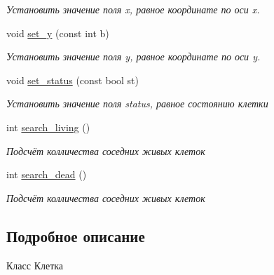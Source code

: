 \begin{DoxyCompactItemize}
\begin{DoxyCompactList}\small\item\em Установить значение поля x, равное координате по оси x. \end{DoxyCompactList}\item 
\hypertarget{classCell_a24fb665d79a98537dbae0764aae6cdc2}{void \hyperlink{classCell_a24fb665d79a98537dbae0764aae6cdc2}{set\+\_\+y} (const int b)}\label{classCell_a24fb665d79a98537dbae0764aae6cdc2}

\begin{DoxyCompactList}\small\item\em Установить значение поля y, равное координате по оси y. \end{DoxyCompactList}\item 
\hypertarget{classCell_aae843541fe3b463ed77d5530e9cab752}{void \hyperlink{classCell_aae843541fe3b463ed77d5530e9cab752}{set\+\_\+status} (const bool st)}\label{classCell_aae843541fe3b463ed77d5530e9cab752}

\begin{DoxyCompactList}\small\item\em Установить значение поля status, равное состоянию клетки \end{DoxyCompactList}\item 
\hypertarget{classCell_ac45949aec18ee3e3a281104e8219242b}{int \hyperlink{classCell_ac45949aec18ee3e3a281104e8219242b}{search\+\_\+living} ()}\label{classCell_ac45949aec18ee3e3a281104e8219242b}

\begin{DoxyCompactList}\small\item\em Подсчёт колличества соседних живых клеток \end{DoxyCompactList}\item 
\hypertarget{classCell_a6b7ced893f37cc3ea997d175b83d0a08}{int \hyperlink{classCell_a6b7ced893f37cc3ea997d175b83d0a08}{search\+\_\+dead} ()}\label{classCell_a6b7ced893f37cc3ea997d175b83d0a08}

\begin{DoxyCompactList}\small\item\em Подсчёт колличества соседних живых клеток \end{DoxyCompactList}\end{DoxyCompactItemize}


\subsection{Подробное описание}
Класс Клетка 

